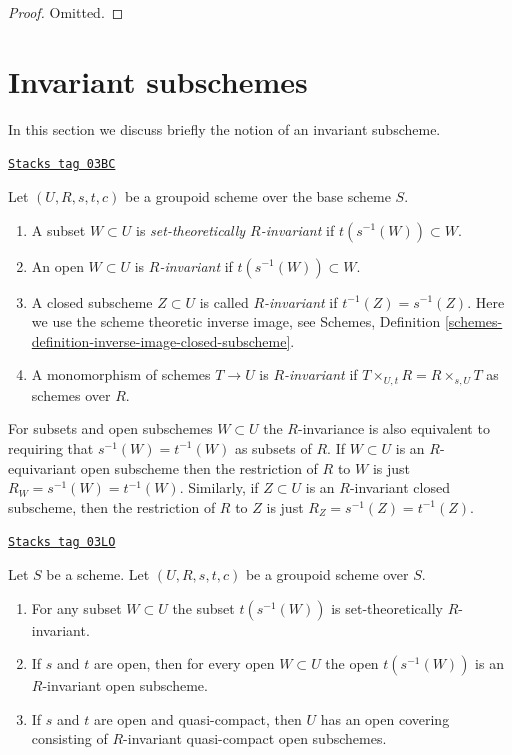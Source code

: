 \begin{proof}
Omitted.
\end{proof}

\section{Invariant subschemes}
\label{groupoids-section-invariant}
In this section we discuss briefly the notion of an invariant subscheme.

\begin{definition}
\label{groupoids-definition-invariant-open}
\href{https://stacks.math.columbia.edu/tag/03BC}{\texttt{Stacks tag 03BC}}

Let $(U, R, s, t, c)$ be a groupoid scheme over the base scheme $S$.
\begin{enumerate}
\item A subset $W \subset U$ is {\it set-theoretically $R$-invariant}
if $t(s^{-1}(W)) \subset W$.
\item An open $W \subset U$ is {\it $R$-invariant} if
$t(s^{-1}(W)) \subset W$.
\item A closed subscheme $Z \subset U$ is called {\it $R$-invariant}
if $t^{-1}(Z) = s^{-1}(Z)$. Here we use the scheme theoretic inverse image, see
Schemes, Definition \ref{schemes-definition-inverse-image-closed-subscheme}.
\item A monomorphism of schemes $T \to U$ is {\it $R$-invariant} if
$T \times_{U, t} R = R \times_{s, U} T$ as schemes over $R$.
\end{enumerate}
\end{definition}

For subsets and open subschemes $W \subset U$ the $R$-invariance
is also equivalent to requiring that $s^{-1}(W) = t^{-1}(W)$
as subsets of $R$. If $W \subset U$ is an $R$-equivariant open subscheme
then the restriction of $R$ to $W$ is just $R_W = s^{-1}(W) = t^{-1}(W)$.
Similarly, if $Z \subset U$ is an $R$-invariant closed subscheme, then
the restriction of $R$ to $Z$ is just $R_Z = s^{-1}(Z) = t^{-1}(Z)$.

\begin{lemma}
\label{groupoids-lemma-constructing-invariant-opens}
\href{https://stacks.math.columbia.edu/tag/03LO}{\texttt{Stacks tag 03LO}}

Let $S$ be a scheme.
Let $(U, R, s, t, c)$ be a groupoid scheme over $S$.
\begin{enumerate}
\item For any subset $W \subset U$ the subset $t(s^{-1}(W))$
is set-theoretically $R$-invariant.
\item If $s$ and $t$ are open, then for every open $W \subset U$
the open $t(s^{-1}(W))$ is an $R$-invariant open subscheme.
\item If $s$ and $t$ are open and quasi-compact, then $U$ has an open
covering consisting of $R$-invariant quasi-compact open subschemes.
\end{enumerate}
\end{lemma}

